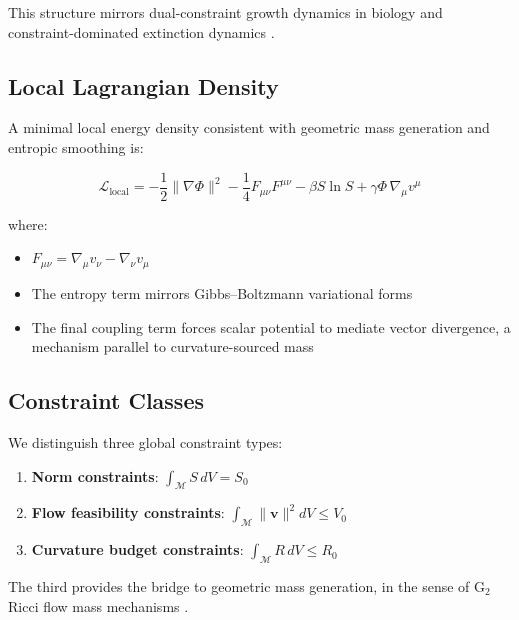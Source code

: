 \documentclass[11pt,a4paper]{article}
\begin{document}
This structure mirrors dual-constraint growth dynamics in biology \citep{Yamagishi2025} and constraint-dominated extinction dynamics \citep{Amadei2025}.

\subsection{Local Lagrangian Density}

A minimal local energy density consistent with geometric mass generation and entropic smoothing is:

\begin{equation}
\mathcal{L}_{\text{local}} =
-\frac{1}{2} \lVert \nabla \Phi \rVert^2
-\frac{1}{4} F_{\mu\nu}F^{\mu\nu}
-\beta S \ln S
+\gamma \Phi \, \nabla_\mu v^\mu
\end{equation}

where:

\begin{itemize}
    \item \(F_{\mu\nu} = \nabla_\mu v_\nu - \nabla_\nu v_\mu\)
    \item The entropy term mirrors Gibbs–Boltzmann variational forms \citep{Boltzmann1877, Gibbs1902}
    \item The final coupling term forces scalar potential to mediate vector divergence, a mechanism parallel to curvature-sourced mass \citep{Pincak2025}
\end{itemize}

\subsection{Constraint Classes}

We distinguish three global constraint types:

\begin{enumerate}
    \item \textbf{Norm constraints}: \( \int_{\mathcal{M}} S \, dV = S_0 \)
    \item \textbf{Flow feasibility constraints}: \( \int_{\mathcal{M}} \lVert \mathbf{v} \rVert^2 dV \le V_0 \)
    \item \textbf{Curvature budget constraints}: \( \int_{\mathcal{M}} R \, dV \le R_0 \)
\end{enumerate}

The third provides the bridge to geometric mass generation, in the sense of G$_2$ Ricci flow mass mechanisms \citep{Joyce2000, Bryant2006, Pincak2025}.
\end{document}
